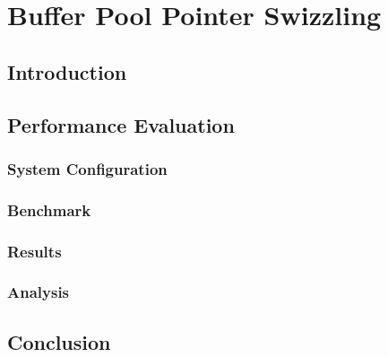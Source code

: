 \chapter[Buffer Pool Pointer Swizzling]{Buffer Pool Pointer Swizzling} \label{ch:pointer_swizzling}

\section{Introduction} \label{sec:pointer_swizzling_intro}

\section[Performance Evaluation]{Performance Evaluation} \label{sec:pointer_swizzling_performance_evaluation}

\subsection[System Configuration]{System Configuration} \label{subsec:pointer_swizzling_system_configuration}

\subsection[Benchmark]{Benchmark} \label{subsec:pointer_swizzling_benchmark}

\subsection[Results]{Results} \label{subsec:pointer_swizzling_results}

\subsection[Analysis]{Analysis} \label{subsec:pointer_swizzling_analysis}

\section{Conclusion} \label{sec:pointer_swizzling_outro}
